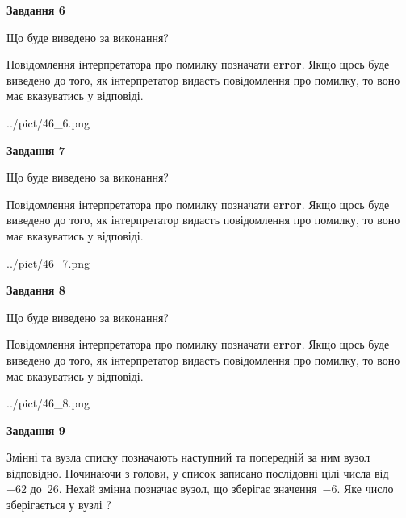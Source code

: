 \documentclass[12pt, ukrainian]{article}
\begin{document}
{\begin {large}
{\begin {center}\textbf{Завдання 6}\end {center}}\par
Що буде виведено за виконання?

Повідомлення інтерпретатора про помилку позначати \textbf{error}.
Якщо щось буде виведено до того, як інтерпретатор видасть повідомлення про помилку, 
то воно має вказуватись у відповіді. \par


\begin{center}
	{../pict/46_6.png}
\end{center}
\newpage

{\begin {center}\textbf{Завдання 7}\end {center}}\par
Що буде виведено за виконання?

Повідомлення інтерпретатора про помилку позначати \textbf{error}.
Якщо щось буде виведено до того, як інтерпретатор видасть повідомлення про помилку, 
то воно має вказуватись у відповіді. \par


\begin{center}
	{../pict/46_7.png}
\end{center}
\newpage

{\begin {center}\textbf{Завдання 8}\end {center}}\par
Що буде виведено за виконання?

Повідомлення інтерпретатора про помилку позначати \textbf{error}.
Якщо щось буде виведено до того, як інтерпретатор видасть повідомлення про помилку, 
то воно має вказуватись у відповіді. \par


\begin{center}
	{../pict/46_8.png}
\end{center}
\newpage

{\begin {center}\textbf{Завдання 9}\end {center}}\par
Змінні  та  вузла списку позначають наступний та попередній за ним вузол відповідно. Починаючи з голови, у список записано послідовні цілі числа від~$-62$ до~$26$. Нехай змінна  позначає вузол, що зберігає значення~$-6$.
Яке число зберігається у вузлі  ?\par
\newpage


\end{large}}
\end{document}

